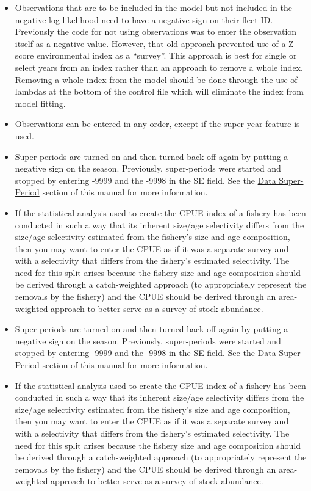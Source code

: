 \begin{itemize}
		\item Observations that are to be included in the model but not included in the negative log likelihood need to have a negative sign on their fleet ID. Previously the code for not using observations was to enter the observation itself as a negative value. However, that old approach prevented use of a Z-score environmental index as a ``survey''. This approach is best for single or select years from an index rather than an approach to remove a whole index. Removing a whole index from the model should be done through the use of lambdas at the bottom of the control file which will eliminate the index from model fitting. 
		\item Observations can be entered in any order, except if the super-year feature is used.
		\item Super-periods are turned on and then turned back off again by putting a negative sign on the season. Previously, super-periods were started and stopped by entering -9999 and the -9998 in the SE field. See the \hyperlink{SuperPeriod}{Data Super-Period} section of this manual for more information.
		\item If the statistical analysis used to create the CPUE index of a fishery has been conducted in such a way that its inherent size/age selectivity differs from the size/age selectivity estimated from the fishery's size and age composition, then you may want to enter the CPUE as if it was a separate survey and with a selectivity that differs from the fishery's estimated selectivity. The need for this split arises because the fishery size and age composition should be derived through a catch-weighted approach (to appropriately represent the removals by the fishery) and the CPUE should be derived through an area-weighted approach to better serve as a survey of stock abundance.
		\item Super-periods are turned on and then turned back off again by putting a negative sign on the season. Previously, super-periods were started and stopped by entering -9999 and the -9998 in the SE field. See the \hyperlink{SuperPeriod}{Data Super-Period} section of this manual for more information.
		\item If the statistical analysis used to create the CPUE index of a fishery has been conducted in such a way that its inherent size/age selectivity differs from the size/age selectivity estimated from the fishery's size and age composition, then you may want to enter the CPUE as if it was a separate survey and with a selectivity that differs from the fishery's estimated selectivity. The need for this split arises because the fishery size and age composition should be derived through a catch-weighted approach (to appropriately represent the removals by the fishery) and the CPUE should be derived through an area-weighted approach to better serve as a survey of stock abundance.
	\end{itemize}

